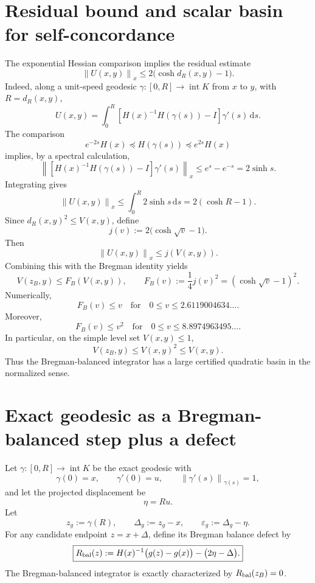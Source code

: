 \documentclass[11pt]{article}
\newcommand{\norm}[1]{\left\lVert #1\right\rVert}
\newcommand{\dd}{\mathrm d}
\begin{document}
\section{Residual bound and scalar basin for self-concordance}

The exponential Hessian comparison implies the residual estimate
\[
    \boxed{
    \norm{U(x,y)}_x
    \le
    2\bigl(\cosh d_R(x,y)-1\bigr).
    }
\]
Indeed, along a unit-speed geodesic $\gamma:[0,R]\to\operatorname{int}K$ from $x$ to $y$, with $R=d_R(x,y)$,
\[
    U(x,y)
    =
    \int_0^R
    \left[H(x)^{-1}H(\gamma(s))-I\right]\gamma'(s)\,\dd s.
\]
The comparison
\[
    e^{-2s}H(x)\preceq H(\gamma(s))\preceq e^{2s}H(x)
\]
implies, by a spectral calculation,
\[
    \left\|
    \left[H(x)^{-1}H(\gamma(s))-I\right]\gamma'(s)
    \right\|_x
    \le
    e^s-e^{-s}=2\sinh s.
\]
Integrating gives
\[
    \norm{U(x,y)}_x\le \int_0^R 2\sinh s\,\dd s
    =2(\cosh R-1).
\]
Since $d_R(x,y)^2\le V(x,y)$, define
\[
    j(v):=2\bigl(\cosh\sqrt v-1\bigr).
\]
Then
\[
    \norm{U(x,y)}_x\le j(V(x,y)).
\]
Combining this with the Bregman identity yields
\[
    \boxed{
    V(z_B,y)
    \le
    F_B(V(x,y)),
    \qquad
    F_B(v):=\frac14j(v)^2=(\cosh\sqrt v-1)^2.
    }
\]
Numerically,
\[
    F_B(v)\le v
    \quad\text{for}\quad
    0\le v\le 2.6119004634\ldots.
\]
Moreover,
\[
    F_B(v)\le v^2
    \quad\text{for}\quad
    0\le v\le 8.8974963495\ldots.
\]
In particular, on the simple level set $V(x,y)\le 1$,
\[
    \boxed{V(z_B,y)\le V(x,y)^2\le V(x,y).}
\]
Thus the Bregman-balanced integrator has a large certified quadratic basin in the normalized sense.

\section{Exact geodesic as a Bregman-balanced step plus a defect}

Let $\gamma:[0,R]\to\operatorname{int}K$ be the exact geodesic with
\[
    \gamma(0)=x,
    \qquad
    \gamma'(0)=u,
    \qquad
    \norm{\gamma'(s)}_{\gamma(s)}=1,
\]
and let the projected displacement be
\[
    \eta=Ru.
\]
Let
\[
    z_g:=\gamma(R),
    \qquad
    \Delta_g:=z_g-x,
    \qquad
    \varepsilon_g:=\Delta_g-\eta.
\]
For any candidate endpoint $z=x+\Delta$, define its Bregman balance defect by
\[
    \boxed{
    R_{\rm bal}(z)
    :=
    H(x)^{-1}\bigl(g(z)-g(x)\bigr)-\bigl(2\eta-\Delta\bigr).
    }
\]
The Bregman-balanced integrator is exactly characterized by $R_{\rm bal}(z_B)=0$.
\end{document}
